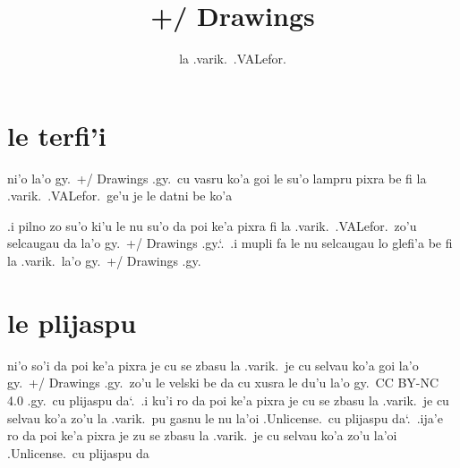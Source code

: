 \documentclass{report}
\title{+/ Drawings}
\author{la .varik.\ .VALefor.}
\newcommand\sds{\spacefactor\sfcode`.\ \space}
\begin{document}
\maketitle{}
\tableofcontents{}
\chapter{le terfi'i}
ni'o la'o gy.\ +/ Drawings .gy.\  cu vasru ko'a goi le su'o lampru pixra be fi la .varik.\ .VALefor.\ ge'u je le datni be ko'a

.i pilno zo su'o ki'u le nu su'o da poi ke'a pixra fi la .varik.\ .VALefor.\ zo'u selcaugau da la'o gy.\ +/ Drawings .gy.\sds  .i mupli fa le nu selcaugau lo glefi'a be fi la .varik.\ la'o gy.\ +/ Drawings .gy.

\chapter{le plijaspu}
ni'o so'i da poi ke'a pixra je cu se zbasu la .varik.\ je cu selvau ko'a goi la'o gy.\ +/ Drawings .gy.\ zo'u le velski be da cu xusra le du'u la'o gy.\ CC BY-NC 4.0 .gy.\ cu plijaspu da\sds  .i ku'i ro da poi ke'a pixra je cu se zbasu la .varik.\ je cu selvau ko'a zo'u la .varik.\ pu gasnu le nu la'oi .Unlicense.\ cu plijaspu da\sds  .ija'e ro da poi ke'a pixra je zu se zbasu la .varik.\ je cu selvau ko'a zo'u la'oi .Unlicense.\ cu plijaspu da
\end{document}
